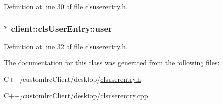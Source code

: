 Definition at line \hyperlink{clsuserentry_8h_source_l00030}{30} of file \hyperlink{clsuserentry_8h_source}{clsuserentry.\-h}.

\hypertarget{classclient_1_1cls_user_entry_a17a901ba37f7a81041453cc9135f2d4c}{
\subsubsection[{user}]{$\ast$ client\-::cls\-User\-Entry\-::user\hspace{0.3cm}{\ttfamily [private]}}}\label{d0/ddb/classclient_1_1cls_user_entry_a17a901ba37f7a81041453cc9135f2d4c}


Definition at line \hyperlink{clsuserentry_8h_source_l00032}{32} of file \hyperlink{clsuserentry_8h_source}{clsuserentry.\-h}.



The documentation for this class was generated from the following files\-:\begin{DoxyCompactItemize}
\item 
C++/custom\-Irc\-Client/desktop/\hyperlink{clsuserentry_8h}{clsuserentry.\-h}\item 
C++/custom\-Irc\-Client/desktop/\hyperlink{clsuserentry_8cpp}{clsuserentry.\-cpp}\end{DoxyCompactItemize}
